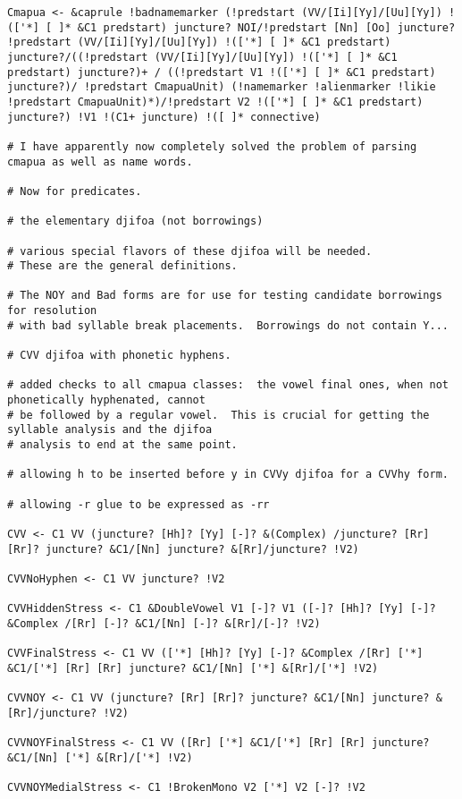 \documentclass{article}
\begin{document}
\begin{verbatim}
Cmapua <- &caprule !badnamemarker (!predstart (VV/[Ii][Yy]/[Uu][Yy]) !(['*] [ ]* &C1 predstart) juncture? NOI/!predstart [Nn] [Oo] juncture? !predstart (VV/[Ii][Yy]/[Uu][Yy]) !(['*] [ ]* &C1 predstart) juncture?/((!predstart (VV/[Ii][Yy]/[Uu][Yy]) !(['*] [ ]* &C1 predstart) juncture?)+ / ((!predstart V1 !(['*] [ ]* &C1 predstart) juncture?)/ !predstart CmapuaUnit) (!namemarker !alienmarker !likie !predstart CmapuaUnit)*)/!predstart V2 !(['*] [ ]* &C1 predstart) juncture?) !V1 !(C1+ juncture) !([ ]* connective)

# I have apparently now completely solved the problem of parsing cmapua as well as name words.

# Now for predicates.

# the elementary djifoa (not borrowings)

# various special flavors of these djifoa will be needed.
# These are the general definitions.

# The NOY and Bad forms are for use for testing candidate borrowings for resolution
# with bad syllable break placements.  Borrowings do not contain Y...

# CVV djifoa with phonetic hyphens.

# added checks to all cmapua classes:  the vowel final ones, when not phonetically hyphenated, cannot
# be followed by a regular vowel.  This is crucial for getting the syllable analysis and the djifoa
# analysis to end at the same point.

# allowing h to be inserted before y in CVVy djifoa for a CVVhy form.

# allowing -r glue to be expressed as -rr

CVV <- C1 VV (juncture? [Hh]? [Yy] [-]? &(Complex) /juncture? [Rr] [Rr]? juncture? &C1/[Nn] juncture? &[Rr]/juncture? !V2)

CVVNoHyphen <- C1 VV juncture? !V2

CVVHiddenStress <- C1 &DoubleVowel V1 [-]? V1 ([-]? [Hh]? [Yy] [-]? &Complex /[Rr] [-]? &C1/[Nn] [-]? &[Rr]/[-]? !V2)

CVVFinalStress <- C1 VV (['*] [Hh]? [Yy] [-]? &Complex /[Rr] ['*] &C1/['*] [Rr] [Rr] juncture? &C1/[Nn] ['*] &[Rr]/['*] !V2)

CVVNOY <- C1 VV (juncture? [Rr] [Rr]? juncture? &C1/[Nn] juncture? &[Rr]/juncture? !V2) 

CVVNOYFinalStress <- C1 VV ([Rr] ['*] &C1/['*] [Rr] [Rr] juncture? &C1/[Nn] ['*] &[Rr]/['*] !V2)

CVVNOYMedialStress <- C1 !BrokenMono V2 ['*] V2 [-]? !V2


\end{verbatim}
\end{document}
